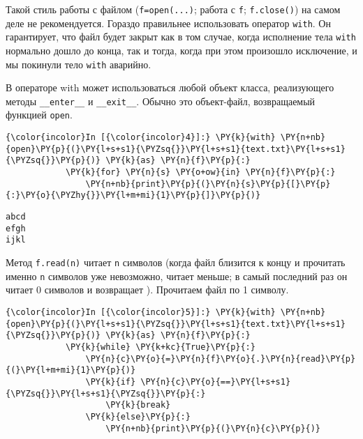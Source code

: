     Такой стиль работы с файлом (\texttt{f=open(...)}; работа с \texttt{f};
\texttt{f.close()}) на самом деле не рекомендуется. Гораздо правильнее
использовать оператор \texttt{with}. Он гарантирует, что файл будет
закрыт как в том случае, когда исполнение тела \texttt{with} нормально
дошло до конца, так и тогда, когда при этом произошло исключение, и мы
покинули тело \texttt{with} аварийно.

В операторе with может использоваться любой объект класса, реализующего
методы \texttt{\_\_enter\_\_} и \texttt{\_\_exit\_\_}. Обычно это
объект-файл, возвращаемый функцией \texttt{open}.

    \begin{Verbatim}[commandchars=\\\{\}]
{\color{incolor}In [{\color{incolor}4}]:} \PY{k}{with} \PY{n+nb}{open}\PY{p}{(}\PY{l+s+s1}{\PYZsq{}}\PY{l+s+s1}{text.txt}\PY{l+s+s1}{\PYZsq{}}\PY{p}{)} \PY{k}{as} \PY{n}{f}\PY{p}{:}
            \PY{k}{for} \PY{n}{s} \PY{o+ow}{in} \PY{n}{f}\PY{p}{:}
                \PY{n+nb}{print}\PY{p}{(}\PY{n}{s}\PY{p}{[}\PY{p}{:}\PY{o}{\PYZhy{}}\PY{l+m+mi}{1}\PY{p}{]}\PY{p}{)}
\end{Verbatim}

    \begin{Verbatim}[commandchars=\\\{\}]
abcd
efgh
ijkl

    \end{Verbatim}

    Метод \texttt{f.read(n)} читает \texttt{n} символов (когда файл близится
к концу и прочитать именно \texttt{n} символов уже невозможно, читает
меньше; в самый последний раз он читает 0 символов и возвращает
\texttt{\textquotesingle{}\textquotesingle{}}). Прочитаем файл по 1
символу.

    \begin{Verbatim}[commandchars=\\\{\}]
{\color{incolor}In [{\color{incolor}5}]:} \PY{k}{with} \PY{n+nb}{open}\PY{p}{(}\PY{l+s+s1}{\PYZsq{}}\PY{l+s+s1}{text.txt}\PY{l+s+s1}{\PYZsq{}}\PY{p}{)} \PY{k}{as} \PY{n}{f}\PY{p}{:}
            \PY{k}{while} \PY{k+kc}{True}\PY{p}{:}
                \PY{n}{c}\PY{o}{=}\PY{n}{f}\PY{o}{.}\PY{n}{read}\PY{p}{(}\PY{l+m+mi}{1}\PY{p}{)}
                \PY{k}{if} \PY{n}{c}\PY{o}{==}\PY{l+s+s1}{\PYZsq{}}\PY{l+s+s1}{\PYZsq{}}\PY{p}{:}
                    \PY{k}{break}
                \PY{k}{else}\PY{p}{:}
                    \PY{n+nb}{print}\PY{p}{(}\PY{n}{c}\PY{p}{)}
\end{Verbatim}


